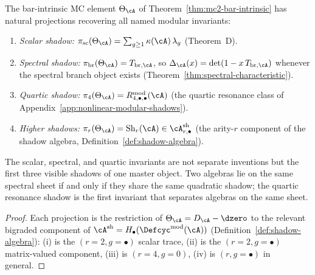 \begin{corollary}
\label{cor:shadow-extraction}
The bar-intrinsic MC element $\Theta_\cA$ of
Theorem~\textup{\ref{thm:mc2-bar-intrinsic}} has natural
projections recovering all named modular invariants:
\begin{enumerate}[label=\textup{(\roman*)}]
\item \emph{Scalar shadow:}
  $\pi_{\mathrm{sc}}(\Theta_\cA)
  = \sum_{g \geq 1} \kappa(\cA)\,\lambda_g$
  \textup{(}Theorem~D\textup{)}.
\item \emph{Spectral shadow:}
  $\pi_{\mathrm{br}}(\Theta_\cA) = T_{\mathrm{br},\cA}$,
  so $\Delta_\cA(x) = \det(1 - x\, T_{\mathrm{br},\cA})$
  whenever the spectral branch object exists
  \textup{(}Theorem~\textup{\ref{thm:spectral-characteristic}}\textup{)}.
\item \emph{Quartic shadow:}
  $\pi_4(\Theta_\cA)
  = R^{\mathrm{mod}}_{4,\bullet,\bullet}(\cA)$
  \textup{(}the quartic resonance class of
  Appendix~\textup{\ref{app:nonlinear-modular-shadows}}\textup{)}.
\item \emph{Higher shadows:}
  $\pi_r(\Theta_\cA)
  = \operatorname{Sh}_r(\cA)
  \in \cA^{\mathrm{sh}}_{r,\bullet}$
  \textup{(}the arity-$r$ component of the shadow algebra,
  Definition~\textup{\ref{def:shadow-algebra}}\textup{)}.
\end{enumerate}
The scalar, spectral, and quartic invariants are not separate
inventions but the first three visible shadows of one master object.
Two algebras lie on the same spectral sheet if and only if they
share the same quadratic shadow; the quartic resonance shadow is
the first invariant that separates algebras on the same sheet.
\end{corollary}

\begin{proof}
Each projection is the restriction of
$\Theta_\cA = D_\cA - \dzero$ to the relevant bigraded
component of $\cA^{\mathrm{sh}} =
H_\bullet(\Defcyc^{\mathrm{mod}}(\cA))$
(Definition~\ref{def:shadow-algebra}):
(i) is the $(r{=}2, g{=}\bullet)$ scalar trace,
(ii) is the $(r{=}2, g{=}\bullet)$ matrix-valued component,
(iii) is $(r{=}4, g{=}0)$,
(iv) is $(r, g{=}\bullet)$ in general.
\end{proof}

